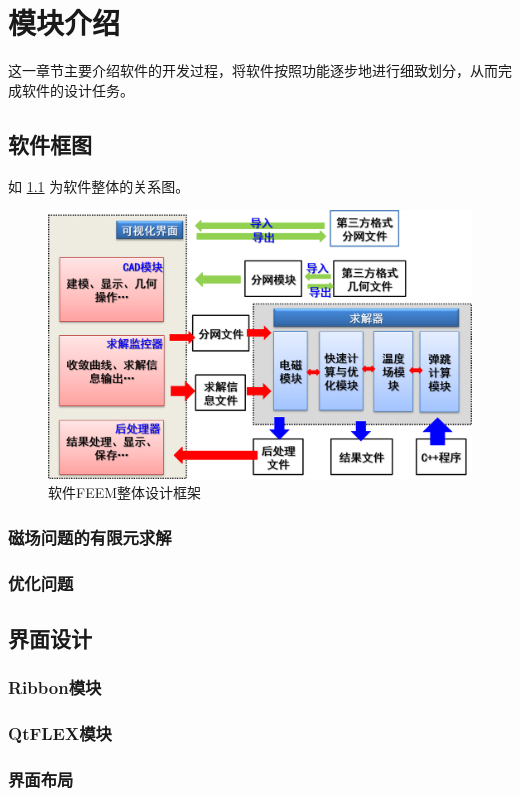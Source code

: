 \chapter{模块介绍}
这一章节主要介绍软件的开发过程，将软件按照功能逐步地进行细致划分，从而完成软件的设计任务。
\section{软件框图}
如 \figurename{} \ref{fig:softarch} 为软件整体的关系图。
\begin{figure}[h]
	\centering
	\includegraphics[width=0.7\linewidth]{figures/softarch}
	\caption{软件FEEM整体设计框架}
	\label{fig:softarch}
\end{figure}

\subsection{磁场问题的有限元求解}

\subsection{优化问题}

\section{界面设计}

\subsection{Ribbon模块}

\subsection{QtFLEX模块}

\subsection{界面布局}

